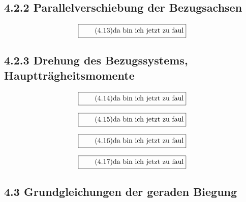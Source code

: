 \documentclass[11pt]{article}
\newcommand{\1}{ {\mathds{1}} }
\begin{document}
    \subsection*{4.2.2 Parallelverschiebung der Bezugsachsen}

    \begin{equation}
      \boxed{
        \tag{4.13}
        \begin{split}
          \text{da bin ich jetzt zu faul}
        \end{split}
      }
    \end{equation}

    \subsection*{4.2.3 Drehung des Bezugssystems, Hauptträgheitsmomente}

    \begin{equation}
      \boxed{
        \tag{4.14}
        \begin{split}
          \text{da bin ich jetzt zu faul}
        \end{split}
      }
    \end{equation}

    \begin{equation}
      \boxed{
        \tag{4.15}
        \begin{split}
          \text{da bin ich jetzt zu faul}
        \end{split}
      }
    \end{equation}

    \begin{equation}
      \boxed{
        \tag{4.16}
        \begin{split}
          \text{da bin ich jetzt zu faul}
        \end{split}
      }
    \end{equation}

    \begin{equation}
      \boxed{
        \tag{4.17}
        \begin{split}
          \text{da bin ich jetzt zu faul}
        \end{split}
      }
    \end{equation}
    
    \subsection*{4.3 Grundgleichungen der geraden Biegung}
\end{document}
